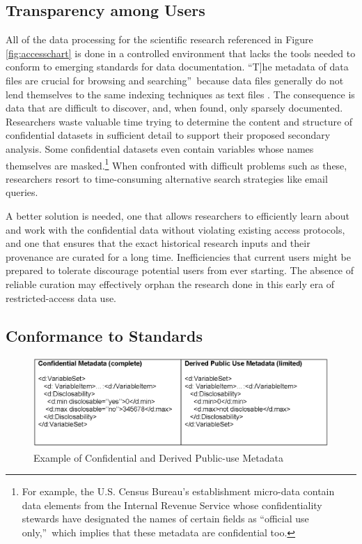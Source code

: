\subsection{Transparency among Users}

All of the data processing for the scientific research referenced in Figure %
\ref{fig:accesschart} is done in a controlled environment that lacks the
tools needed to conform to emerging standards for data documentation.
\textquotedblleft \lbrack T]he metadata of data files are crucial for
browsing and searching\textquotedblright\ because data files generally do
not lend themselves to the same indexing techniques as text files \cite%
{hensequadt2011}. %
The consequence is data that are difficult to discover,
and, when found, only sparsely documented. Researchers waste valuable time
trying to determine the content and structure of confidential datasets in
sufficient detail to support their proposed secondary analysis. Some
confidential datasets even contain variables whose names themselves are
masked.\footnote{%
For example, the U.S. Census Bureau's establishment micro-data contain data
elements from the Internal Revenue Service whose confidentiality stewards
have designated the names of certain fields as \textquotedblleft official
use only,\textquotedblright\ which implies that these metadata are
confidential too.} When confronted with difficult problems such as these,
researchers resort to time-consuming alternative search strategies like
email queries.

A better solution is needed, one that allows researchers to efficiently
learn about and work with the confidential data without violating existing
access protocols, and one that ensures that the exact historical research
inputs and their provenance are curated for a long time.  Inefficiencies that
current users might be prepared to tolerate discourage potential users from
ever starting. The absence of reliable curation may effectively orphan the
research done in this early era of restricted-access data use.


\subsection{Conformance to Standards}

\begin{figure}[tbp]
\centering
\caption{Example of Confidential and Derived Public-use Metadata}
\label{fig:ConfidentialMetadata}\includegraphics[width=0.5%
\textwidth]{ConfidentialMetadata}
\end{figure}

